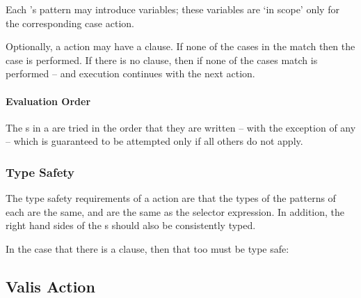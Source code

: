 Each 's pattern may introduce variables; these variables are `in scope' only for the corresponding case action.

Optionally, a  action may have a  clause. If none of the cases in the  match then the  case is performed. If there is no  clause, then if none of the cases match  is performed -- and execution continues with the next action.


\paragraph{Evaluation Order}
The s in a  are tried in the order that they are written -- with the exception of any   -- which is guaranteed to be attempted only if all others do not apply.

\subsubsection{Type Safety}
The type safety requirements of a  action are that the types of the patterns of each  are the same, and are the same as the selector expression. In addition, the right hand sides of the s should also be consistently typed.

\begin{prooftree}
\end{prooftree}

In the case that there is a  clause, then that too must be type safe:
\begin{prooftree}
\end{prooftree}

\subsection{Valis Action}
\label{valisAction}

